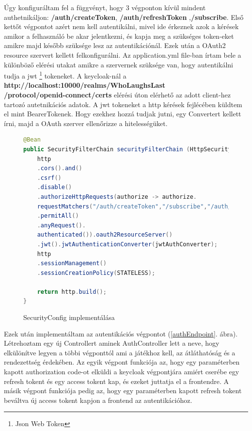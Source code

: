 \documentclass[a4paper,twoside]{article}
\begin{document}
Úgy konfiguráltam fel a függvényt, hogy 3 végponton kívül mindent authetnikáljon: \textbf{/auth/createToken}, \textbf{/auth/refreshToken} ,\textbf{/subscribe}. Első kettőt végpontot azért nem kell autentikálni, mivel ide érkeznek azok a kérések amikor a felhasználó be akar jelentkezni, és kapja meg a szükséges token-eket amikre majd később szüksége lesz az autentikációnál. Ezek után a OAuth2 resource szervert kellett felkonfigurálni. Az application.yml file-ban írtam bele a különböző elérési utakat amikre a szervernek szüksége van, hogy autentikálni tudja a jwt \footnote{Json Web Token} tokeneket. A keycloak-nál a \textbf{http://localhost:10000/realms/WhoLaughsLast\\/protocol/openid-connect/certs} elérési úton 
elérhető az adott client-hez tartozó autetnikációs adatok. A jwt tokeneket a http kérések fejlécében küldtem el mint BearerTokenek. Hogy ezekhez hozzá tudjak jutni,
egy Convertert kellett írni, majd a OAuth szerver ellenőrizze a hitelességüket. 

\begin{figure}
	\caption{SecurityConfig implementálása}
	\centering
\begin{lstlisting}[language=java,breaklines=true]
@Bean
public SecurityFilterChain securityFilterChain (HttpSecurity http) throws Exception{
	http
	.cors().and()
	.csrf()
	.disable()
	.authorizeHttpRequests(authorize -> authorize.
	requestMatchers("/auth/createToken","/subscribe","/auth/refreshToken")
	.permitAll()
	.anyRequest().
	authenticated()).oauth2ResourceServer()
	.jwt().jwtAuthenticationConverter(jwtAuthConverter);
	http
	.sessionManagement()
	.sessionCreationPolicy(STATELESS);
	
	return http.build();
}
\end{lstlisting}
\label{secConf}
\end{figure}
\FloatBarrier


Ezek után implementáltam az autentikációs végpontot (\ref{authEndpoint}. ábra). Létrehoztam egy új Controllert aminek AuthController lett a neve,
hogy elkülönítve legyen a többi végponttól ami a játékhoz kell, az átláthatóság és a rendezettség érdekében. Az egyik végpont 
funkciója az, hogy egy paraméterben kapott authorization code-ot elküldi a keycloak végpontjára amiért cserébe egy refresh tokent és egy access tokent kap,
és ezeket juttatja el a frontendre. A másik végpont funkciója pedig az, hogy egy paraméterben kapott refresh tokent beváltva új access tokent kapjon a frontend az autentikációhoz. 
\end{document}
